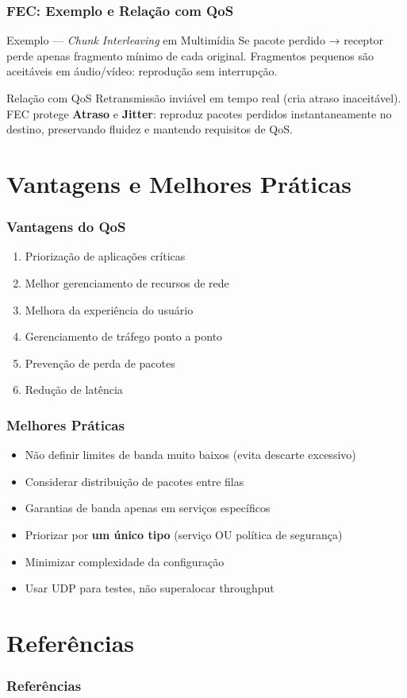 \documentclass{beamer}
\begin{document}
  \begin{frame}
    \frametitle{FEC: Exemplo e Relação com QoS}
    \begin{block}{Exemplo — \textit{Chunk Interleaving} em Multimídia}
      Se pacote perdido → receptor perde apenas fragmento mínimo de cada original.
      Fragmentos pequenos são aceitáveis em áudio/vídeo: reprodução sem interrupção.
    \end{block}
    \vspace{0.5em}
    \begin{alertblock}{Relação com QoS}
      Retransmissão inviável em tempo real (cria atraso inaceitável). FEC protege
      \textbf{Atraso} e \textbf{Jitter}: reproduz pacotes perdidos instantaneamente
      no destino, preservando fluidez e mantendo requisitos de QoS.
    \end{alertblock}
  \end{frame}

  \section{Vantagens e Melhores Práticas}

  \begin{frame}
    \frametitle{Vantagens do QoS}
    \begin{enumerate}
      \item<1-> Priorização de aplicações críticas
      \item<2-> Melhor gerenciamento de recursos de rede
      \item<3-> Melhora da experiência do usuário
      \item<4-> Gerenciamento de tráfego ponto a ponto
      \item<5-> Prevenção de perda de pacotes
      \item<6-> Redução de latência
    \end{enumerate}
  \end{frame}

  \begin{frame}
    \frametitle{Melhores Práticas}
    \begin{itemize}
      \item<1-> Não definir limites de banda muito baixos (evita descarte excessivo)
      \item<2-> Considerar distribuição de pacotes entre filas
      \item<3-> Garantias de banda apenas em serviços específicos
      \item<4-> Priorizar por \textbf{um único tipo} (serviço OU política de segurança)
      \item<5-> Minimizar complexidade da configuração
      \item<6-> Usar UDP para testes, não superalocar throughput
    \end{itemize}
  \end{frame}

  \section*{Referências}

  \begin{frame}[allowframebreaks]
    \frametitle{Referências}
    
    
  \end{frame}
\end{document}
